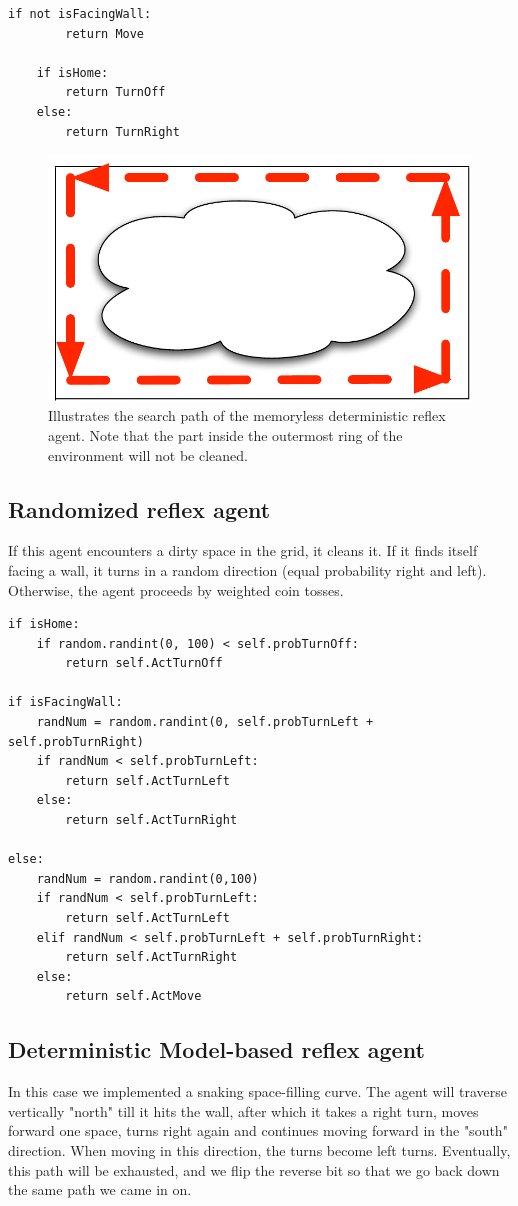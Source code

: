 \documentclass{article}
\begin{document}
\begin{lstlisting}[frame=single]		
	if not isFacingWall:
		return Move
			
	if isHome:
		return TurnOff
	else:
		return TurnRight
\end{lstlisting}

\begin{figure}[h!]
\centering
\includegraphics[width=.5\linewidth]{reflex.pdf}
\caption{Illustrates the search path of the memoryless deterministic reflex agent.  Note that the part inside the outermost ring of the environment will not be cleaned.}
\label{fig:reflex}
\end{figure}


\subsection{Randomized reflex agent}
If this agent encounters a dirty space in the grid, it cleans it. If it finds itself facing a wall, it turns in a random direction (equal probability right and left). Otherwise, the agent proceeds by weighted coin tosses.




\begin{lstlisting}[frame=single]
if isHome:
	if random.randint(0, 100) < self.probTurnOff:
		return self.ActTurnOff

if isFacingWall:
	randNum = random.randint(0, self.probTurnLeft + self.probTurnRight)
	if randNum < self.probTurnLeft:
		return self.ActTurnLeft
	else:
		return self.ActTurnRight

else:
	randNum = random.randint(0,100)
	if randNum < self.probTurnLeft:
		return self.ActTurnLeft
	elif randNum < self.probTurnLeft + self.probTurnRight:
		return self.ActTurnRight
	else:
		return self.ActMove
\end{lstlisting}



\subsection{Deterministic Model-based reflex agent}
In this case we implemented a snaking space-filling curve.  The agent will traverse vertically "north" till it hits the wall, after which it takes a right turn, moves forward one space, turns right again and continues moving forward in the "south" direction. When moving in this direction, the turns become left turns.  Eventually, this path will be exhausted, and we flip the reverse bit so that we go back down the same path we came in on.
\end{document}
